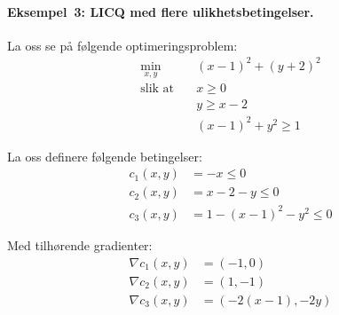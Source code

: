 \paragraph{Eksempel~3: LICQ med flere ulikhetsbetingelser.}
La oss se på følgende optimeringsproblem:
\[
\begin{aligned}
\min_{x,y} \quad & (x-1)^2 + (y+2)^2 \\
\text{slik at} \quad & x \geq 0 \\
& y \geq x-2 \\
& (x-1)^2 + y^2 \geq 1
\end{aligned}
\]

La oss definere følgende betingelser:
\[
\begin{aligned}
c_1(x,y) &= -x \leq 0 \\
c_2(x,y) &= x-2-y \leq 0 \\
c_3(x,y) &= 1-(x-1)^2-y^2 \leq 0
\end{aligned}
\]

Med tilhørende gradienter:
\[
\begin{aligned}
\nabla c_1(x,y) &= (-1,0) \\
\nabla c_2(x,y) &= (1,-1) \\
\nabla c_3(x,y) &= (-2(x-1),-2y)
\end{aligned}
\]

